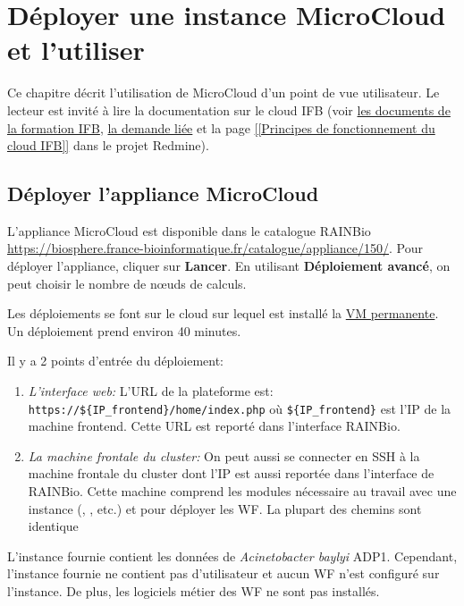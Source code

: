 \chapter{Déployer une instance MicroCloud et l'utiliser} \label{chap:deploiement}

Ce chapitre décrit l'utilisation de MicroCloud d'un point de vue utilisateur.
Le lecteur est invité à lire la documentation sur le cloud IFB
(voir \href{https://intranet.genoscope.cns.fr/agc/redmine/documents/86}{les documents de la formation IFB},
\href{https://intranet.genoscope.cns.fr/agc/redmine/issues/6010}{la demande liée}
et la page \href{https://intranet.genoscope.cns.fr/agc/redmine/projects/microcloud/wiki/Principes_de_fonctionnement_du_cloud_IFB}{[[Principes de fonctionnement du cloud IFB]]}
dans le projet Redmine).

\section{Déployer l'appliance MicroCloud}

L'appliance MicroCloud est disponible dans le catalogue RAINBio \url{https://biosphere.france-bioinformatique.fr/catalogue/appliance/150/}.
Pour déployer l'appliance, cliquer sur \textbf{Lancer}.
En utilisant \textbf{Déploiement avancé}, on peut choisir le nombre de nœuds de calculs.

Les déploiements se font sur le cloud  sur lequel est installé la \hyperref[VM permanente]{VM permanente}.
Un déploiement prend environ 40 minutes.

\bigskip

Il y a 2 points d'entrée du déploiement:
\begin{enumerate}
    \item \emph{L'interface web:} L'URL de la plateforme est: \nolinkurl{https://${IP_frontend}/home/index.php} où \nolinkurl{${IP_frontend}}
          est l'IP de la machine frontend.
          Cette URL est reporté dans l'interface RAINBio.
    \item \emph{La machine frontale du cluster:} On peut aussi se connecter en SSH à la machine frontale du cluster
          dont l'IP est aussi reportée dans l'interface de RAINBio.
          Cette machine comprend les modules nécessaire au travail avec une instance (, , etc.)
          et  pour déployer les WF.
          La plupart des chemins sont identique
\end{enumerate}
L'instance fournie contient les données de \textit{Acinetobacter baylyi} ADP1.
Cependant, l'instance fournie ne contient pas d'utilisateur
et aucun WF n'est configuré sur l'instance.
De plus, les logiciels métier des WF ne sont pas installés.

